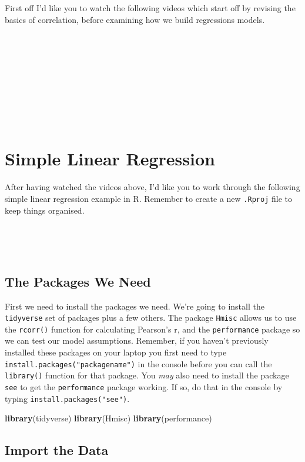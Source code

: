 \documentclass[
]{book}
\newenvironment{Shaded}{\begin{snugshade}}{\end{snugshade}}
\newcommand{\FunctionTok}[1]{\textcolor[rgb]{0.13,0.29,0.53}{\textbf{#1}}}
\newcommand{\NormalTok}[1]{#1}
\begin{document}
First off I'd like you to watch the following videos which start off by revising the basics of correlation, before examining how we build regressions models.

~~

~~

~~

~~

~~

\hypertarget{simple-linear-regression}{%
\section{Simple Linear Regression}\label{simple-linear-regression}}

After having watched the videos above, I'd like you to work through the following simple linear regression example in R. Remember to create a new \texttt{.Rproj} file to keep things organised.

~~

~~

\hypertarget{the-packages-we-need}{%
\subsection{The Packages We Need}\label{the-packages-we-need}}

First we need to install the packages we need. We're going to install the \texttt{tidyverse} set of packages plus a few others. The package \texttt{Hmisc} allows us to use the \texttt{rcorr()} function for calculating Pearson's r, and the \texttt{performance} package so we can test our model assumptions. Remember, if you haven't previously installed these packages on your laptop you first need to type \texttt{install.packages("packagename")} in the console before you can call the \texttt{library()} function for that package. You \emph{may} also need to install the package \texttt{see} to get the \texttt{performance} package working. If so, do that in the console by typing \texttt{install.packages("see")}.

\begin{Shaded}
\begin{Highlighting}[]
\FunctionTok{library}\NormalTok{(tidyverse)}
\FunctionTok{library}\NormalTok{(Hmisc)}
\FunctionTok{library}\NormalTok{(performance)}
\end{Highlighting}
\end{Shaded}

\hypertarget{import-the-data}{%
\subsection{Import the Data}\label{import-the-data}}
\end{document}
